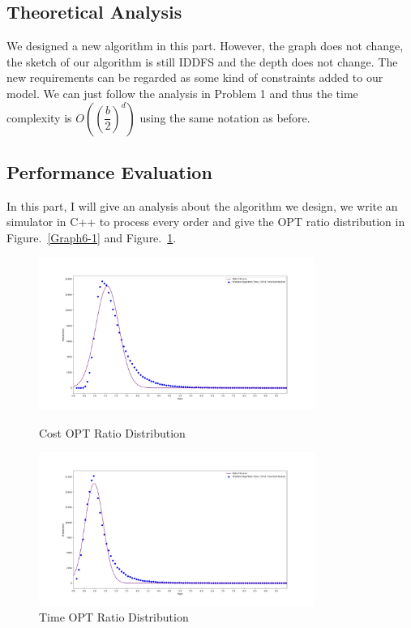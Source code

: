 \documentclass{llncs}
\begin{document}
\subsection{Theoretical Analysis}
We designed a new algorithm in this part. However, the graph does not change, the sketch of our algorithm is still IDDFS and the depth does not change. The new requirements can be regarded as some kind of constraints added to our model. We can just follow the analysis in Problem 1 and thus the time complexity is $O((\dfrac{b}{2})^d)$ using the same notation as before.
\subsection{Performance Evaluation}
In this part, I will give an analysis about the algorithm we design, we write an simulator in C++ to process every order and give the OPT ratio distribution in Figure.~\ref{Graph6-1} and Figure.~\ref{Graph6-2}.

\begin{figure}[htbp]
\centering
\begin{minipage}[t]{0.48\textwidth}
\centering
\includegraphics[width=9cm]{graph/cost_prob4.jpg}
\caption{Cost OPT Ratio Distribution}
\label{Graph6-1}
\end{minipage}
\begin{minipage}[t]{0.48\textwidth}
\centering
\includegraphics[width=9cm]{graph/time_prob4.jpg}
\caption{Time OPT Ratio Distribution}
\label{Graph6-2}
\end{minipage}
\end{figure}
\end{document}
